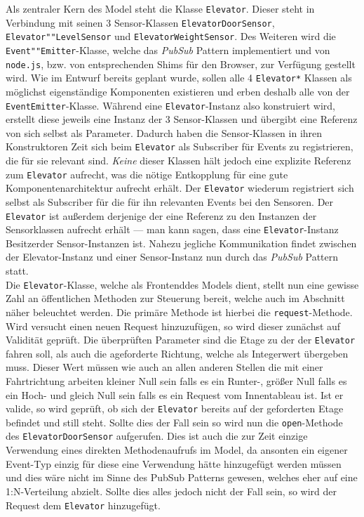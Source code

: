 Als zentraler Kern des Model steht die Klasse \texttt{Elevator}.
Dieser steht in Verbindung mit seinen 3 Sensor-Klassen \texttt{ElevatorDoorSensor}, \texttt{Elevator""LevelSensor} und \texttt{ElevatorWeightSensor}.
Des Weiteren wird die \texttt{Event""Emitter}-Klasse, welche das \textit{PubSub} Pattern implementiert und von \texttt{node.js}, bzw. von entsprechenden Shims für den Browser, zur Verfügung gestellt wird.
Wie im Entwurf bereits geplant wurde, sollen alle 4 \texttt{Elevator*} Klassen als möglichst eigenständige Komponenten existieren und erben deshalb alle von der \texttt{EventEmitter}-Klasse.
Während eine \texttt{Elevator}-Instanz also konstruiert wird, erstellt diese jeweils eine Instanz der 3 Sensor-Klassen und übergibt eine Referenz von sich selbst als Parameter.
Dadurch haben die Sensor-Klassen in ihren Konstruktoren Zeit sich beim \texttt{Elevator} als Subscriber für Events zu registrieren, die für sie relevant sind.
\textit{Keine} dieser Klassen hält jedoch eine explizite Referenz zum \texttt{Elevator} aufrecht, was die nötige Entkopplung für eine gute Komponentenarchitektur aufrecht erhält.
Der \texttt{Elevator} wiederum registriert sich selbst als Subscriber für die für ihn relevanten Events bei den Sensoren.
Der \texttt{Elevator} ist außerdem derjenige der eine Referenz zu den Instanzen der Sensorklassen aufrecht erhält --- man kann sagen, dass eine \texttt{Elevator}-Instanz \glqq Besitzer\grqq der Sensor-Instanzen ist.
Nahezu jegliche Kommunikation findet zwischen der Elevator-Instanz und einer Sensor-Instanz nun durch das \textit{PubSub} Pattern statt. \\

Die \texttt{Elevator}-Klasse, welche als \glqq Frontend\grqq des Models dient, stellt nun eine gewisse Zahl an öffentlichen Methoden zur Steuerung bereit, welche auch im Abschnitt \textit{} näher beleuchtet werden.
Die primäre Methode ist hierbei die \texttt{request}-Methode.
Wird versucht einen neuen Request hinzuzufügen, so wird dieser zunächst auf Validität geprüft.
Die überprüften Parameter sind die Etage zu der der \texttt{Elevator} fahren soll, als auch die ageforderte Richtung, welche als Integerwert übergeben muss.
Dieser Wert müssen wie auch an allen anderen Stellen die mit einer Fahrtrichtung arbeiten kleiner Null sein falls es ein Runter-, größer Null falls es ein Hoch- und gleich Null sein falls es ein Request vom Innentableau ist.
Ist er valide, so wird geprüft, ob sich der \texttt{Elevator} bereits auf der geforderten Etage befindet und still steht.
Sollte dies der Fall sein so wird nun die \texttt{open}-Methode des \texttt{ElevatorDoorSensor} aufgerufen.
Dies ist auch die zur Zeit einzige Verwendung eines direkten Methodenaufrufs im Model, da ansonten ein eigener Event-Typ einzig für diese eine Verwendung hätte hinzugefügt werden müssen und dies wäre nicht im Sinne des PubSub Patterns gewesen, welches eher auf eine 1:N-Verteilung abzielt.
Sollte dies alles jedoch nicht der Fall sein, so wird der Request dem \texttt{Elevator} hinzugefügt. \\

